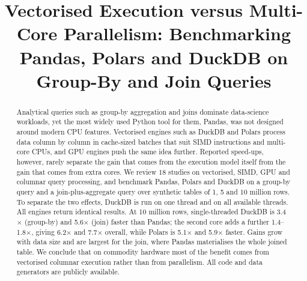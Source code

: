 \documentclass[conference,a4paper]{IEEEtran}
\begin{document}
\title{Vectorised Execution versus Multi-Core Parallelism: Benchmarking Pandas, Polars and DuckDB on Group-By and Join Queries}

\author{
\and
{}
\and
{}
\and
{}
}

\maketitle

\begin{abstract}
Analytical queries such as group-by aggregation and joins dominate data-science workloads, yet the most widely used Python tool for them, Pandas, was not designed around modern CPU features. Vectorised engines such as DuckDB and Polars process data column by column in cache-sized batches that suit SIMD instructions and multi-core CPUs, and GPU engines push the same idea further. Reported speed-ups, however, rarely separate the gain that comes from the execution model itself from the gain that comes from extra cores. We review 18 studies on vectorised, SIMD, GPU and columnar query processing, and benchmark Pandas, Polars and DuckDB on a group-by query and a join-plus-aggregate query over synthetic tables of 1, 5 and 10 million rows. To separate the two effects, DuckDB is run on one thread and on all available threads. All engines return identical results. At 10 million rows, single-threaded DuckDB is 3.4$\times$ (group-by) and 5.6$\times$ (join) faster than Pandas; the second core adds a further 1.4--1.8$\times$, giving 6.2$\times$ and 7.7$\times$ overall, while Polars is 5.1$\times$ and 5.9$\times$ faster. Gains grow with data size and are largest for the join, where Pandas materialises the whole joined table. We conclude that on commodity hardware most of the benefit comes from vectorised columnar execution rather than from parallelism. All code and data generators are publicly available.
\end{abstract}
\end{document}
